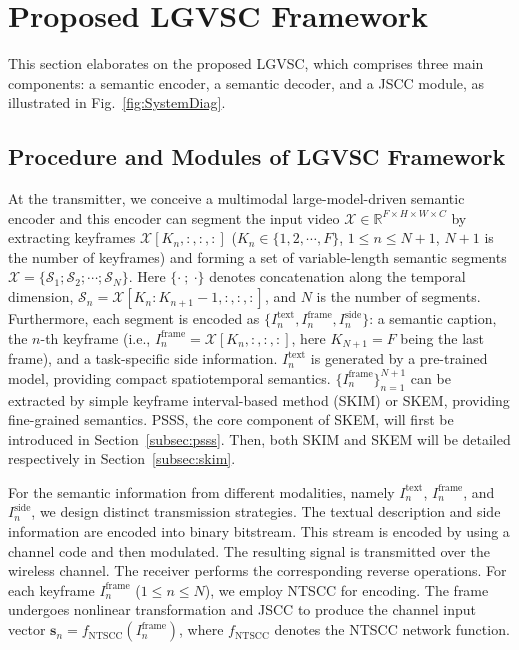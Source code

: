 \documentclass[10pt,journal]{IEEEtran}
\begin{document}
\section{Proposed LGVSC Framework}\label{sec:ourwork}
This section elaborates on the proposed LGVSC, which comprises three main components: a semantic encoder, a semantic decoder, and a JSCC module, as illustrated in Fig.~\ref{fig:SystemDiag}.

\subsection{Procedure and Modules of LGVSC Framework}

At the transmitter, we conceive a multimodal large-model-driven semantic encoder and this encoder can segment the input video $\mathcal{X} \in \mathbb{R}^{F \times H \times W \times C}$ by extracting keyframes $\mathcal{X}[K_n,:,:,:]$ ($K_n \in \{1,2,\cdots, F\}$, $1 \leq n \leq N+1$, $N+1$ is the number of keyframes) and forming a set of variable-length semantic segments $\mathcal{X} = \{\mathcal{S}_1; \mathcal{S}_2; \cdots; \mathcal{S}_N\}$. Here $\{\cdot~;~\cdot\}$ denotes concatenation along the temporal dimension, $\mathcal{S}_n = \mathcal{X}[K_n\!:\!K_{n+1}\!-\!1,:,:,:]$, and $N$ is the number of segments. Furthermore, each segment is encoded as $\{I^{\text{text}}_n, I^{\text{frame}}_n, I^{\text{side}}_n\}$: a semantic caption, the $n$-th keyframe (i.e., $I^{\text{frame}}_n = \mathcal{X}[K_n,:,:,:]$, here $K_{N+1} = F$ being the last frame), and a task-specific side information. $I^\text{text}_n$ is generated by a pre-trained model, providing compact spatiotemporal semantics. $\{I^\text{frame}_n\}_{n=1}^{N+1}$ can be extracted by simple keyframe interval-based method (SKIM) or SKEM, providing fine-grained semantics. PSSS, the core component of SKEM, will first be introduced in Section~\ref{subsec:psss}. Then, both SKIM and SKEM will be detailed respectively in Section~\ref{subsec:skim}.

For the semantic information from different modalities, namely $I^{\text{text}}_n$, $I^{\text{frame}}_n$, and $I^{\text{side}}_n$, we design distinct transmission strategies. The textual description and side information are encoded into binary bitstream. This stream is encoded by using a channel code and then modulated. The resulting signal is transmitted over the wireless channel. The receiver performs the corresponding reverse operations.
For each keyframe $I^{\text{frame}}_n$ ($1 \leq n \leq N$), we employ NTSCC for encoding. The frame undergoes nonlinear transformation and JSCC to produce the channel input vector $\mathbf{s}_n = f_{\text{NTSCC}}(I^{\text{frame}}_n)$, where $f_{\text{NTSCC}}$ denotes the NTSCC network function.
\end{document}
